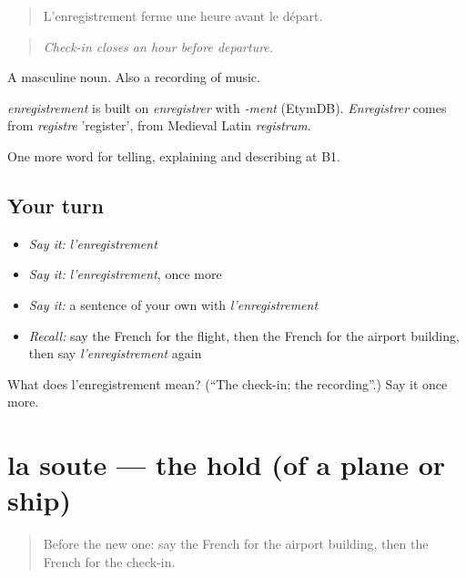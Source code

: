 \begin{quote}
L'enregistrement ferme une heure avant le départ.
\end{quote}

\begin{quote}
\emph{Check-in closes an hour before departure.}
\end{quote}

A masculine noun. Also a recording of music.

\begin{cousinweb}
\emph{enregistrement} is built on \emph{enregistrer} with \emph{-ment} (EtymDB). \emph{Enregistrer} comes from \emph{registre} 'register', from Medieval Latin \emph{registrum}.
\end{cousinweb}

\begin{grammarlens}[title={What you've built}]
One more word for telling, explaining and describing at B1.
\end{grammarlens}

\subsection*{Your turn}
\begin{itemize}
\raggedright
  \item \emph{Say it:} \emph{l'enregistrement}
  \item \emph{Say it:} \emph{l'enregistrement}, once more
  \item \emph{Say it:} a sentence of your own with \emph{l'enregistrement}
  \item \emph{Recall:} say the French for the flight, then the French for the airport building, then say \emph{l'enregistrement} again
\end{itemize}

\begin{tcolorbox}[breakable,colback=teal!4,colframe=teal!35!black,title={Before you move on}]
What does l'enregistrement mean? (\textquotedblleft{}The check-in; the recording\textquotedblright{}.) Say it once more.
\end{tcolorbox}
\section[la soute]{la soute — the hold (of a plane or ship)}

\label{lesson:FR-C416-soute}



\begin{quote}
Before the new one: say the French for the airport building, then the French for the check-in.
\end{quote}

